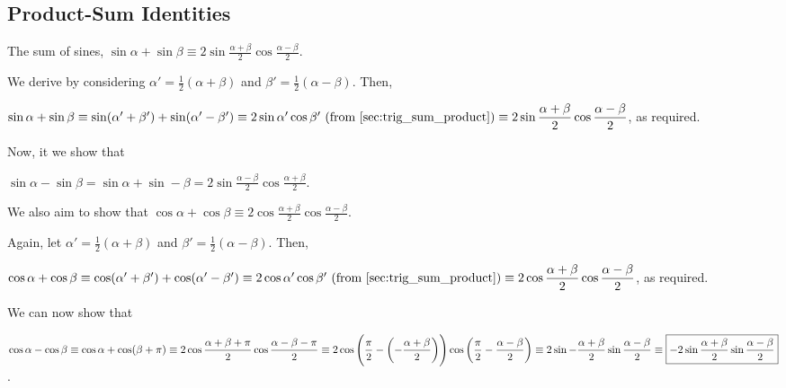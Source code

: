 \documentclass[a4paper,11pt]{article}
\begin{document}
    \subsection{Product-Sum Identities}


    The sum of sines, $\displaystyle \boxed{\sin \alpha + \sin \beta \equiv
        2 \sin \frac{\alpha + \beta}2 \cos \frac{\alpha - \beta}2}$.

    We derive by considering $\alpha' = \frac 12 (\alpha + \beta)$ and
    $\beta' = \frac 12 (\alpha - \beta)$. Then,

    $\sin \alpha + \sin \beta \equiv
     \sin(\alpha' + \beta') + \sin(\alpha' - \beta') \equiv
     2\sin \alpha' \cos \beta'\ \text{(from \ref{sec:trig_sum_product})}
     \\\\\equiv
    \displaystyle
        2 \sin \frac{\alpha + \beta}2 \cos \frac{\alpha - \beta}2$, as required.

    Now, it we show that

    $\displaystyle \boxed{\sin \alpha - \sin \beta =
        \sin \alpha + \sin -\beta =
        2 \sin \frac{\alpha - \beta} 2 \cos\frac{\alpha + \beta} 2}$.

    We also aim to show that
    $\displaystyle \boxed{\cos \alpha + \cos \beta \equiv
        2 \cos\frac{\alpha + \beta} 2 \cos \frac{\alpha - \beta} 2}$.

    Again, let $\alpha' = \frac 12 (\alpha + \beta)$ and
    $\beta' = \frac 12 (\alpha - \beta)$. Then,

    $\cos \alpha + \cos \beta \equiv
     \cos(\alpha' + \beta') + \cos(\alpha' - \beta') \equiv
     2\cos \alpha' \cos \beta'\ \text{(from \ref{sec:trig_sum_product})}
     \\\\\equiv
     \displaystyle
        2 \cos\frac{\alpha + \beta} 2 \cos \frac{\alpha - \beta} 2$,
    as required.

    We can now show that

    $\displaystyle \cos \alpha - \cos \beta \equiv
     \cos \alpha + \cos (\beta + \pi)  \equiv
     2 \cos \frac{\alpha + \beta + \pi} 2 \cos \frac {\alpha - \beta - \pi} 2
     \\\equiv
     2 \cos \left(\frac \pi 2 - \left(-\frac{\alpha + \beta} 2\right)\right)
       \cos \left(\frac \pi 2 - \frac{\alpha - \beta} 2 \right) \equiv
     2 \sin -\frac{\alpha + \beta} 2 \sin \frac{\alpha - \beta} 2 \\\\\equiv
     \boxed{-2 \sin \frac{\alpha + \beta} 2 \sin \frac{\alpha - \beta} 2}$.
\end{document}

